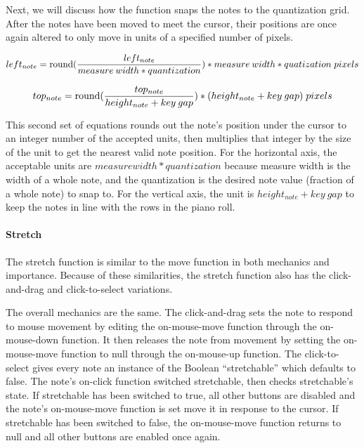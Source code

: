 Next, we will discuss how the function snaps the notes to the quantization grid. After the notes
have been moved to meet the cursor, their positions are once again altered to only move in units of
a specified number of pixels.

\begin{equation} \label{horz_snap}
  left_{note} = \operatorname{round}(\frac{left_{note}}{measure\:width * quantization}) * measure\:width * quatization \;pixels
\end{equation}

\begin{equation} \label{vert_snap}
  top_{note} = \operatorname{round}(\frac{top_{note}}{height_{note} + key\:gap}) * (height_{note} + key\:gap) \;pixels
\end{equation}

This second set of equations rounds out the note’s position under the cursor to an integer number
of the accepted units, then multiplies that integer by the size of the unit to get the nearest
valid note position. For the horizontal axis, the acceptable units are $ measure width * quantization $
because measure width is the width of a whole note, and the quantization is the desired note value (fraction
of a whole note) to snap to. For the vertical axis, the unit is $ height_{note} + key\:gap $ to
keep the notes in line with the rows in the piano roll.

\paragraph{Stretch}

The stretch function is similar to the move function in both mechanics and importance. Because of
these similarities, the stretch function also has the click-and-drag and click-to-select variations.

The overall mechanics are the same. The click-and-drag sets the note to respond to mouse movement
by editing the on-mouse-move function through the on-mouse-down function. It then releases the note
from movement by setting the on-mouse-move function to null through the on-mouse-up function. The
click-to-select gives every note an instance of the Boolean “stretchable” which defaults to false.
The note’s on-click function switched stretchable, then checks stretchable’s state. If stretchable
has been switched to true, all other buttons are disabled and the note’s on-mouse-move function is
set move it in response to the cursor. If stretchable has been switched to false, the on-mouse-move
function returns to null and all other buttons are enabled once again.

